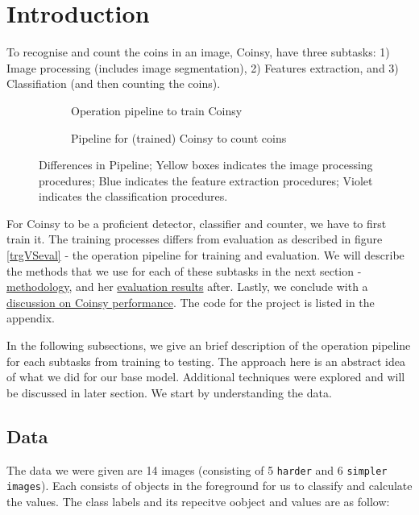\documentclass[main.tex]{subfiles}
\begin{document}
\section[intro]{Introduction\hypertarget{sec:intro}{}}
To recognise and count the coins in an image, Coinsy, have three subtasks: 1) Image processing (includes image segmentation), 2) Features extraction, and 3) Classifiation (and then counting the coins).

\begin{figure}[!t]
  \begin{subfigure}[t]{0.5\textwidth}
    \centering
    \resizebox{\linewidth}{!}{}
    \caption{Operation pipeline to train Coinsy} \label{trgPipe}
  \end{subfigure}
  \begin{subfigure}[t]{0.5\textwidth}
    \centering
    \resizebox{\linewidth}{!}{}
    \caption{Pipeline for (trained) Coinsy to count coins} \label{evalPipe}
  \end{subfigure}
  \caption{Differences in Pipeline; Yellow boxes indicates the image processing procedures; Blue indicates the feature extraction procedures; Violet indicates the classification procedures.} \label{trgVSeval}
\end{figure}

For Coinsy to be a proficient detector, classifier and counter, we have to first train it. The training processes differs from evaluation as described in figure \autoref{trgVSeval} - the operation pipeline for training and evaluation. We will describe the methods that we use for each of these subtasks in the next section - \hyperlink{method}{methodology}, and her \hyperlink{resut}{evaluation results} after. Lastly, we conclude with a \hyperlink{discussion}{discussion on Coinsy performance}. The code for the project is listed in the appendix.

In the following subsections, we give an brief description of the operation pipeline for each subtasks from training to testing. The approach here is an abstract idea of what we did for our base model. Additional techniques were explored and will be discussed in later section. We start by understanding the data.

\subsection*{Data} \label{sec:Data}
The data we were given are 14 images (consisting of 5 \texttt{harder} and 6 \texttt{simpler images}). Each consists of objects in the foreground for us to classify and calculate the values. The class labels and its repecitve oobject and values are as follow:
\end{document}
